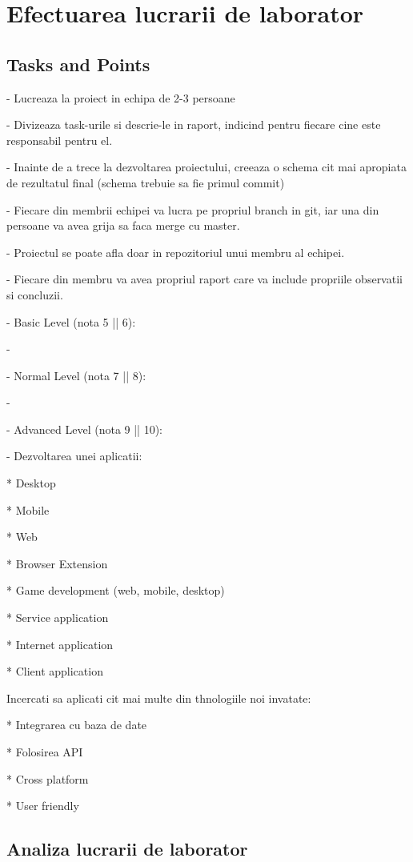 \section{Efectuarea lucrarii de laborator}



\subsection{Tasks and Points}



- Lucreaza la proiect in echipa de 2-3 persoane

- Divizeaza task-urile si descrie-le in raport, indicind pentru fiecare cine este responsabil pentru el.

- Inainte de a trece la dezvoltarea proiectului, creeaza o schema cit mai apropiata de rezultatul final (schema trebuie sa fie primul commit)

- Fiecare din membrii echipei va lucra pe propriul branch in git, iar una din persoane va avea grija sa faca merge cu master.

- Proiectul se poate afla doar in repozitoriul unui membru al echipei.

- Fiecare din membru va avea propriul raport care va include propriile observatii si concluzii.


- Basic Level (nota 5 || 6):

-

- Normal Level (nota 7 || 8):

-
 
- Advanced Level (nota 9 || 10):

- Dezvoltarea unei aplicatii:

* Desktop

* Mobile

* Web 

* Browser Extension

* Game development (web, mobile, desktop)

* Service application

* Internet application

* Client application


Incercati sa aplicati cit mai multe din thnologiile noi invatate:

* Integrarea cu baza de date

* Folosirea API

* Cross platform

* User friendly

\subsection{Analiza lucrarii de laborator}


